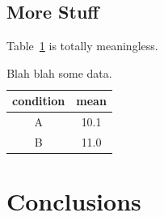 \documentclass[letterpaper,titlepage,11pt]{article}
\begin{document}
\lipsum[1-4]

\subsection{More Stuff}

Table~\ref{tbl:somedata} is totally meaningless.

\begin{table}[H]
	\centering
	\begin{tabular}{c|c}
		condition &mean\\
		\hline\hline
		A         &10.1\\
		B         &11.0\\
	\end{tabular}
 \caption{Blah blah some data.}
 \label{tbl:somedata}
\end{table}

\lipsum[1-2]

\section{Conclusions}

\lipsum[1-2]

 

\end{document}
